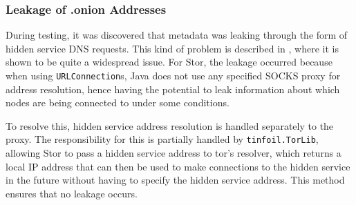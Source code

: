 		\subsubsection*{Leakage of .onion Addresses}
			During testing, it was discovered that metadata was leaking through the form of hidden service DNS requests. This kind of problem is described in \cite{Thomas:2014:MLO:2665943.2665951}, where it is shown to be quite a widespread issue. For Stor, the leakage occurred because when using \texttt{URLConnection}s, Java does not use any specified SOCKS proxy for address resolution, hence having the potential to leak information about which nodes are being connected to under some conditions.
			
			To resolve this, hidden service address resolution is handled separately to the proxy. The responsibility for this is partially handled by \texttt{tinfoil.TorLib}, allowing Stor to pass a hidden service address to tor's resolver, which returns a local IP address that can then be used to make connections to the hidden service in the future without having to specify the hidden service address. This method ensures that no leakage occurs.